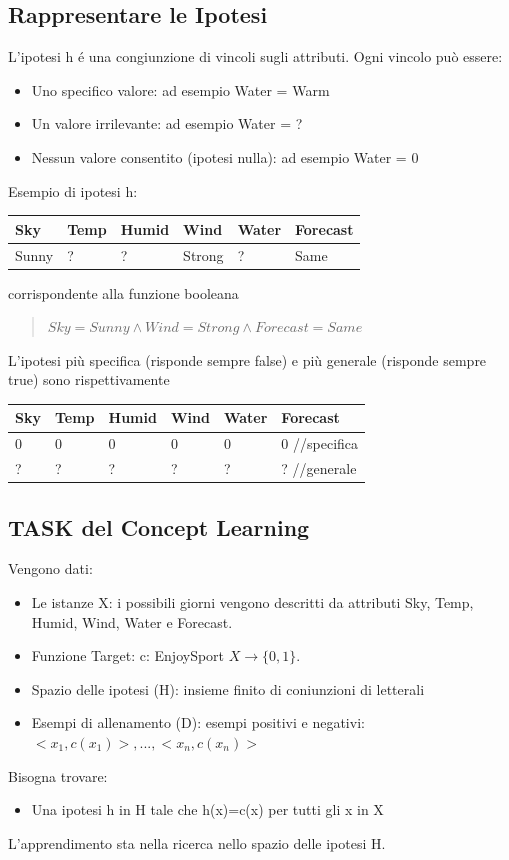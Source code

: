 \documentclass{article}
\begin{document}
\subsection{Rappresentare le Ipotesi}
L'ipotesi h é una congiunzione di vincoli sugli attributi. Ogni vincolo può essere:
\begin{itemize}
    \item Uno specifico valore: ad esempio Water = Warm
    \item Un valore irrilevante: ad esempio Water = ?
    \item Nessun valore consentito (ipotesi nulla): ad esempio Water = 0
\end{itemize}
Esempio di ipotesi h:
\begin{table}[H]
\centering
\begin{tabular}{l|l|l|l|l|l}
Sky & Temp & Humid & Wind & Water & Forecast \\ \hline
Sunny & ? & ? & Strong & ? & Same
\end{tabular}
\end{table}
corrispondente alla funzione booleana
\begin{quote}
    $Sky=Sunny \land Wind=Strong \land Forecast=Same$
\end{quote}
L'ipotesi più specifica (risponde sempre false) e più generale (risponde sempre true) sono rispettivamente
\begin{table}[H]
\centering
\begin{tabular}{l|l|l|l|l|l}
Sky & Temp & Humid & Wind & Water & Forecast \\ \hline
0 & 0 & 0 & 0 & 0 & 0 \quad //specifica \\
? & ? & ? & ? & ? & ? \quad //generale
\end{tabular}
\end{table}

\subsection{TASK del Concept Learning}
Vengono dati:
\begin{itemize}
    \item Le istanze X: i possibili giorni vengono descritti da attributi Sky, Temp, Humid, Wind, Water e Forecast.
    \item Funzione Target: c: EnjoySport $X \rightarrow \{0,1\}$.
    \item Spazio delle ipotesi (H): insieme finito di coniunzioni di letterali
    \item Esempi di allenamento (D): esempi positivi e negativi: $<x_1, c(x_1)>, ..., <x_n, c(x_n)>$
\end{itemize}
Bisogna trovare:
\begin{itemize}
    \item Una ipotesi h in H tale che h(x)=c(x) per tutti gli x in X
\end{itemize}
L'apprendimento sta nella ricerca nello spazio delle ipotesi H.
\end{document}
